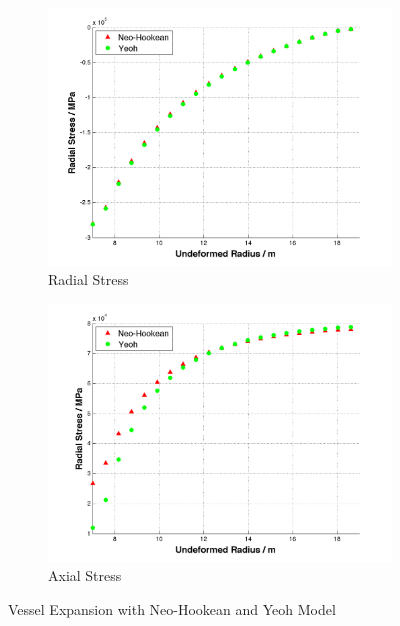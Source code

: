 \begin{figure}[t!p]
	\begin{subfigure}[b]{0.5\textwidth}
		\centering
		\includegraphics[width=\textwidth]{./figures/radial_nh_yeoh.png}
		\caption{Radial Stress}
		\label{radial_nh_yeoh}
	\end{subfigure}
	\begin{subfigure}[b]{0.5\textwidth}
		\centering
		\includegraphics[width=\textwidth]{./figures/axial_nh_yeoh.png}
		\caption{Axial Stress}
		\label{axial_nh_yeoh}
	\end{subfigure}
	\caption{Vessel Expansion with Neo-Hookean and Yeoh Model}
	\label{fig:nh_yeoh}
\end{figure}

















